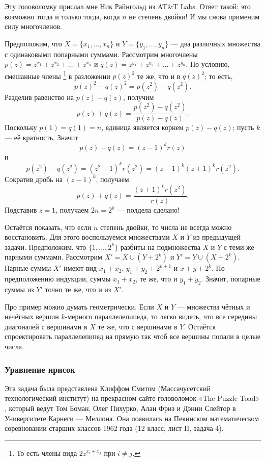 Эту головоломку прислал мне Ник Райнгольд из AT\&T Labs.
Ответ такой: это возможно тогда и только тогда, когда $n$ не степень двойки!
И мы снова применим силу многочленов.

Предположим, что $X = \{x_1 , \dots , x_n\}$ и $Y = \{y_1 , \dots , y_n\}$ --- два различных множества с одинаковыми попарными суммами.
Рассмотрим многочлены
$p(z)=z^{x_1} + z^{x_2} + \dots + z^{x_n}$
и 
$q(z)=z^{y_1} + z^{y_2} + \dots + z^{y_n}$.
По условию, смешанные члены%
\footnote{То есть члены вида $2z^{x_i+x_j}$ при $i\ne j$.} в разложении $p(z)^2$ те же, что и в $q(z)^2$;
то есть,
\[p(z)^2 -q(z)^2 = p(z^2 )-q(z^2).\]
Разделив равенство на $p(z) - q(z)$, получим
\[p(z) + q(z) =
\frac{p(z^2 ) - q(z^2 )}{p(z) - q(z)}.
\]
Поскольку $p(1) = q(1) = n$,
единица является корнем $p(z) - q(z)$; пусть $k$ --- её кратность.
Значит
\[p(z) - q(z) = (z - 1)^k r(z)\]
и
\[p(z^2 ) - q(z^2 ) = (z^2 - 1)^k r(z^2 )= (z - 1)^k (z + 1)^k r(z^2).\]
Сократив дробь на $(z - 1)^k$, получаем
\[p(z) + q(z) =
\frac{(z + 1)^k r(z^2)}{r(z)}.
\]
Подставив $z = 1$, получаем $2n = 2^k$ --- полдела сделано!

Остаётся показать, что если $n$ степень двойки, то
числа не всегда можно восстановить.
Для этого воспользуемся множествами $X$ и $Y$ из предыдущей задачи.
Предположим, что $\{1, \dots , 2^k\}$ разбиты на подмножества $X$ и $Y$ с теми же парными суммами.
Рассмотрим $X' = X \cup (Y + 2^k)$ и $Y' = Y \cup (X + 2^k)$.
Парные суммы $X'$ имеют вид $x_1 + x_2$, $y_1 + y_2 + 2^{k+1}$ и $x + y + 2^k$.
По предположению индукции,
суммы $x_1 + x_2$, те же, что и $y_1 + y_2$.
Значит, попарные суммы из $Y'$ точно те же, что и из $X'$.

\begin{addedbytheeditors}
Про пример можно думать геометрически.
Если $X$ и $Y$ --- множества чётных и нечётных вершин $k$-мерного параллелепипеда, то легко видеть, что все середины диагоналей с вершинами в $X$ те же, что с вершинами в $Y$.
Остаётся спроектировать параллелепипед на прямую так чтоб все вершины попали в целые числа.\pr
\end{addedbytheeditors}

\subsubsection*{Уравнение ирисок}

Эта задача была представлена Клиффом Смитом (Массачусетский технологический институт) на прекрасном сайте головоломок «The Puzzle Toad» \cite{bohman-pikhurko-frieze-sleator}, который ведут Том Боман, Олег Пихурко, Алан Фриз и Дэнни Слейтор в Университете Карнеги — Меллона.
Она появилась на Пекинском математическом соревновании старших классов 1962 года (12 класс, лист II, задача 4).

